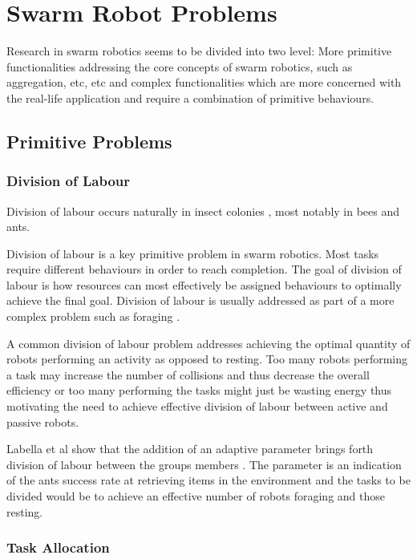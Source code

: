 \section{Swarm Robot Problems}
\label{swarmrobotapplications}
Research in swarm robotics seems to be divided into two level: More primitive functionalities addressing the core concepts of swarm robotics, such as aggregation, etc, etc and complex functionalities which are more concerned with the real-life application and require a combination of primitive behaviours.

\subsection{Primitive Problems}

\subsubsection{Division of Labour}
Division of labour occurs naturally in insect colonies \cite{gautrais2002emergent}, most notably in bees and ants.

Division of labour is a key primitive problem  in swarm robotics. Most tasks require different behaviours in order to reach completion. The goal of division of labour is how resources can most effectively be assigned behaviours to optimally achieve the final goal. Division of labour is usually addressed as part of a more complex problem such as foraging \cite{jones2003adaptive}.
 
A common division of labour problem addresses achieving the optimal quantity of robots performing an activity as opposed to resting. Too many robots performing a task may increase the number of collisions and thus decrease the overall efficiency or too many performing the tasks might just be wasting energy thus motivating the need to achieve effective division of labour between active and passive robots.

Labella et al show  that the addition of an adaptive parameter brings forth division of labour between the groups members \cite{labella2006division}. The parameter is an indication of the ants success rate at retrieving items in the environment and the tasks to be divided would be to achieve an effective number of robots foraging and those resting.


\subsubsection{Task Allocation}


